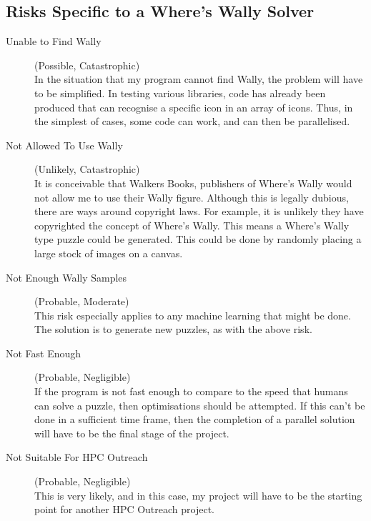 \documentclass[../main.tex]{subfiles}
\begin{document}
   \subsection{Risks Specific to a Where's Wally Solver}
    \begin{description}
      \item[Unable to Find Wally] (Possible, Catastrophic)\\
        In the situation that my program cannot find Wally, the problem will have to be simplified.
        In testing various libraries, code has already been produced that can recognise a specific icon in an array of icons.
        Thus, in the simplest of cases, some code can work, and can then be parallelised.
      \item[Not Allowed To Use Wally] (Unlikely, Catastrophic)\\
        It is conceivable that  Walkers Books, publishers of Where's Wally would not allow me to use their Wally figure.
        Although this is legally dubious, there are ways around copyright laws.
        For example, it is unlikely they have copyrighted the concept of Where's Wally.
        This means a Where's Wally type puzzle could be generated.
        This could be done by randomly placing a large stock of images on a canvas.
      \item[Not Enough Wally Samples] (Probable, Moderate)\\
        This risk especially applies to any machine learning that might be done.
        The solution is to generate new puzzles, as with the above risk.
      \item[Not Fast Enough] (Probable, Negligible) \\
        If the program is not fast enough to compare to the speed that humans can solve a puzzle, then optimisations should be attempted.
        If this can't be done in a sufficient time frame, then the completion of a parallel solution will have to be the final stage of the project.
      \item[Not Suitable For HPC Outreach] (Probable, Negligible) \\
        This is very likely, and in this case, my project will have to be the starting point for another HPC Outreach project.
    \end{description}
\end{document}
